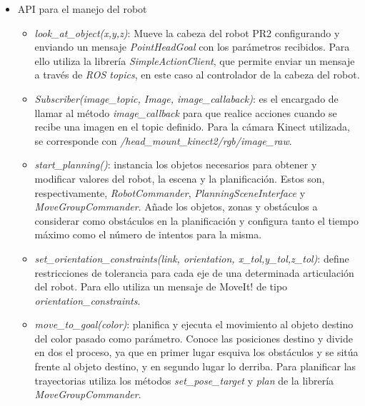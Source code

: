 \documentclass[12pt,spanish,chapterprefix, numbers=noenddot]{book}
\numberwithin{equation}{section}
\numberwithin{figure}{section}
\begin{document}
\begin{itemize}
\item{API para el manejo del robot}
    \begin{itemize}
    \item \textit{look\_at\_object(x,y,z)}: Mueve la cabeza del robot PR2 configurando y enviando un mensaje \textit{PointHeadGoal} con los parámetros recibidos. Para ello utiliza la librería \textit{SimpleActionClient}, que permite enviar un mensaje a través de \textit{ROS topics}, en este caso al controlador de la cabeza del robot. 
    \item \textit{Subscriber(image\_topic, Image, image\_callaback)}: es el encargado de llamar al método \textit{image\_callback} para que realice acciones cuando se recibe una imagen en el topic definido. Para la cámara Kinect utilizada, se corresponde con \textit{/head\_mount\_kinect2/rgb/image\_raw}.
    \item \textit{start\_planning()}: instancia los objetos necesarios para obtener y modificar valores del robot, la escena y la planificación. Estos son, respectivamente, \textit{RobotCommander}, \textit{PlanningSceneInterface} y \textit{MoveGroupCommander}. Añade los objetos, zonas y obstáculos a considerar como obstáculos en la planificación y configura tanto el tiempo máximo como el número de intentos para la misma. 
    \item \textit{set\_orientation\_constraints(link, orientation, x\_tol,y\_tol,z\_tol)}: define restricciones de tolerancia para cada eje de una determinada articulación del robot. Para ello utiliza un mensaje de MoveIt! de tipo \textit{orientation\_constraints}.
    \item \textit{move\_to\_goal(color)}: planifica y ejecuta el movimiento al objeto destino del color pasado como parámetro. Conoce las posiciones destino y divide en dos el proceso, ya que en primer lugar esquiva los obstáculos y se sitúa frente al objeto destino, y en segundo lugar lo derriba. Para planificar las trayectorias utiliza los métodos \textit{set\_pose\_target} y \textit{plan} de la librería \textit{MoveGroupCommander}.
    \end{itemize}
\end{itemize}
\end{document}
